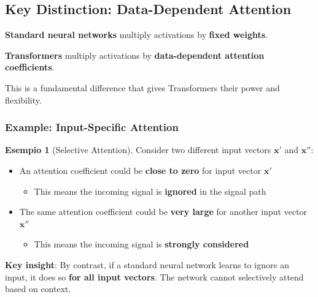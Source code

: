 \documentclass[11pt,a4paper]{article}
\theoremstyle{definition}
\newtheorem{example}{Esempio}[section]
\theoremstyle{plain}
\theoremstyle{remark}
\begin{document}
\subsection{Key Distinction: Data-Dependent Attention}

\begin{tcolorbox}[colback=red!10!white,colframe=red!75!black,title=\textbf{Important Notice}]
\textbf{Standard neural networks} multiply activations by \textbf{fixed weights}.

\textbf{Transformers} multiply activations by \textbf{data-dependent attention coefficients}.

This is a fundamental difference that gives Transformers their power and flexibility.
\end{tcolorbox}

\subsubsection{Example: Input-Specific Attention}

\begin{example}[Selective Attention]
Consider two different input vectors $\mathbf{x}'$ and $\mathbf{x}''$:

\begin{itemize}
    \item An attention coefficient could be \textbf{close to zero} for input vector $\mathbf{x}'$
    \begin{itemize}
        \item This means the incoming signal is \textbf{ignored} in the signal path
    \end{itemize}
    
    \item The same attention coefficient could be \textbf{very large} for another input vector $\mathbf{x}''$
    \begin{itemize}
        \item This means the incoming signal is \textbf{strongly considered}
    \end{itemize}
\end{itemize}

\textbf{Key insight}: By contrast, if a standard neural network learns to ignore an input, it does so \textbf{for all input vectors}. The network cannot selectively attend based on context.
\end{example}
\end{document}
